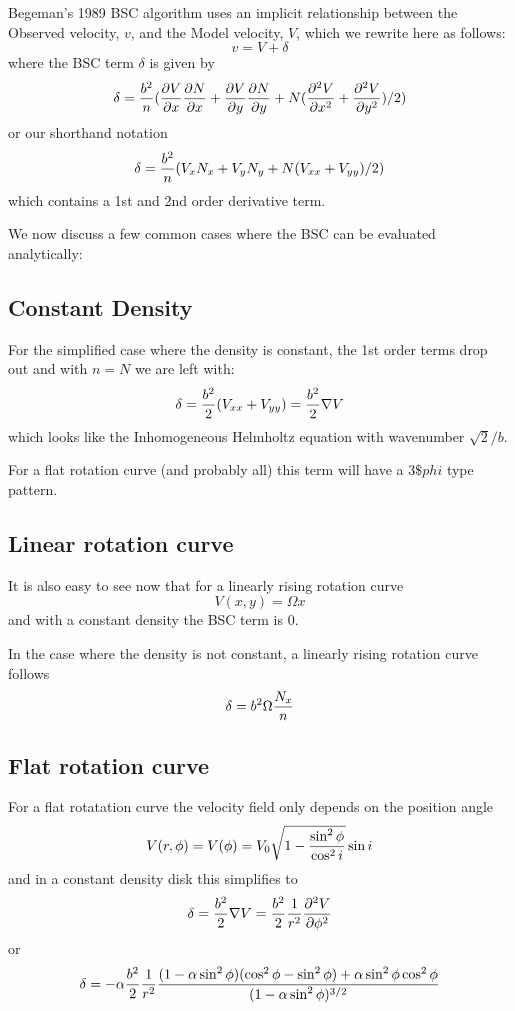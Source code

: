 \documentclass[12pt]{article}
\begin{document}
Begeman's 1989 BSC algorithm uses an implicit relationship between the Observed velocity, $v$, and the Model velocity, $V$,
which we rewrite here as follows:
$$
   v = V + \delta
$$
where the BSC term $\delta$ is given by
$$   
\delta = {b^2 \over n} ( {\partial{V}\over\partial{x}} {\partial{N}\over\partial{x}} + {\partial{V}\over\partial{y}} {\partial{N}\over\partial{y}}
 + N ({\partial^2{V}\over\partial{x^2}} + {\partial^2{V}\over\partial{y^2}}) / 2)
$$
or our shorthand notation
$$   
     \delta = {b^2 \over n} ( V_x N_x + V_y N_y + N (V_{xx} + V_{yy}) / 2)
$$   
which contains a 1st and 2nd order derivative term.

We now discuss a few common cases where the BSC can be evaluated analytically:

\subsection{Constant Density}
For the simplified case where the density is constant, 
the 1st order terms drop out and with $n=N$ we are left with:
$$
    \delta = {b^2\over 2} ( V_{xx} + V_{yy}) = {b^2\over 2} \nabla V 
$$
which looks like the Inhomogeneous Helmholtz equation with wavenumber $\sqrt{2}/b$.

For a flat rotation curve (and probably all) this term will have a $3\$phi$ type
pattern.
    

    
\subsection{Linear rotation curve}
It is also easy to see now that for a linearly rising rotation curve
$$    
V(x,y) = \Omega x
$$
and with a constant density the BSC term is 0.

In the case where the density is not constant, a linearly rising rotation curve follows
$$
   \delta =  b^2   \Omega  {N_x \over n}
$$
   
\subsection{Flat rotation curve}

For a flat rotatation curve the velocity field only depends on the position angle
$$
V(r,\phi) = V(\phi) = V_0 \sqrt{1-{\sin^2\phi \over \cos^2i}} \sin i
$$
and in a constant density disk this simplifies to
$$
\delta =  {b^2\over 2} \nabla V =  {b^2\over 2} {1\over r^2}   {\partial^2{V}\over\partial{\phi^2}}
$$
or
$$
\delta =  {-\alpha} { b^2\over 2} {1\over r^2}
  {  { (1-\alpha \sin^2\phi)(\cos^2\phi-\sin^2\phi) + \alpha \sin^2\phi \cos^2\phi}   \over { (1-\alpha \sin^2\phi)^{3/2}} }
$$
\end{document}
